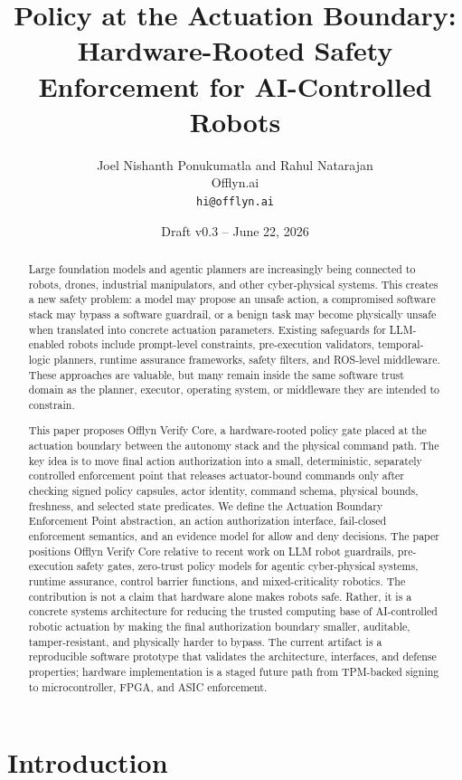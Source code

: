 \documentclass[10pt]{article}
\title{Policy at the Actuation Boundary:\\Hardware-Rooted Safety Enforcement for AI-Controlled Robots}
\author{Joel Nishanth Ponukumatla and Rahul Natarajan\\Offlyn.ai\\\texttt{hi@offlyn.ai}}
\date{Draft v0.3 -- June 22, 2026}
\newcommand{\ovc}{Offlyn Verify Core\xspace}
\newcommand{\abep}{Actuation Boundary Enforcement Point\xspace}
\begin{document}
\maketitle

\begin{abstract}
Large foundation models and agentic planners are increasingly being connected to robots, drones, industrial manipulators, and other cyber-physical systems. This creates a new safety problem: a model may propose an unsafe action, a compromised software stack may bypass a software guardrail, or a benign task may become physically unsafe when translated into concrete actuation parameters. Existing safeguards for LLM-enabled robots include prompt-level constraints, pre-execution validators, temporal-logic planners, runtime assurance frameworks, safety filters, and ROS-level middleware. These approaches are valuable, but many remain inside the same software trust domain as the planner, executor, operating system, or middleware they are intended to constrain.

This paper proposes \ovc, a hardware-rooted policy gate placed at the actuation boundary between the autonomy stack and the physical command path. The key idea is to move final action authorization into a small, deterministic, separately controlled enforcement point that releases actuator-bound commands only after checking signed policy capsules, actor identity, command schema, physical bounds, freshness, and selected state predicates. We define the \abep abstraction, an action authorization interface, fail-closed enforcement semantics, and an evidence model for allow and deny decisions. The paper positions \ovc relative to recent work on LLM robot guardrails, pre-execution safety gates, zero-trust policy models for agentic cyber-physical systems, runtime assurance, control barrier functions, and mixed-criticality robotics. The contribution is not a claim that hardware alone makes robots safe. Rather, it is a concrete systems architecture for reducing the trusted computing base of AI-controlled robotic actuation by making the final authorization boundary smaller, auditable, tamper-resistant, and physically harder to bypass. The current artifact is a reproducible software prototype that validates the architecture, interfaces, and defense properties; hardware implementation is a staged future path from TPM-backed signing to microcontroller, FPGA, and ASIC enforcement.
\end{abstract}

\section{Introduction}
\end{document}

